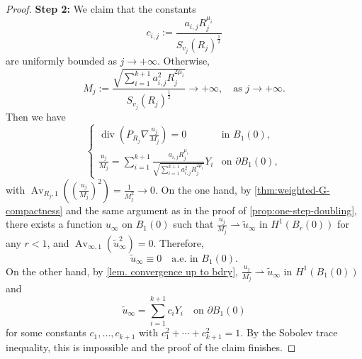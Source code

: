 \documentclass[12pt]{amsart}
\theoremstyle{plain}
\theoremstyle{definition}
\theoremstyle{remark}     %
\numberwithin{equation}{section}
\begin{document}
\begin{proof}
{\bf Step 2:} 
We claim that the constants 
\[
    c_{i,j}:=\frac{a_{i,j} R_j^{\mu_i}}{S_{v_j}(R_j)^{\frac{1}{2}}}
\]
are uniformly bounded as $j\to+\infty$. Otherwise, 
\[
    M_j:=\frac{\sqrt{\sum_{i=1}^{k+1} a_{i,j}^2R_j^{2\mu_i}}}
    {S_{v_j}(R_j)^{\frac{1}{2}}}\to +\infty,
    \quad\text{as }j\to+\infty.
\]
Then we have
\[
    \begin{cases}
        \operatorname{div}
        \left(
        P_{R_j}\nabla \frac{u_j}{M_j}
        \right)=0
        &\text{in }B_{1}(0),\\
        \frac{u_j}{M_j}=\sum_{i=1}^{k+1}
        \frac{a_{i,j} R_j^{\mu_i}}
        {\sqrt{\sum_{i=1}^{k+1} a_{i,j}^2R_j^{2\mu_i}}}Y_i
        &\text{on }\partial B_{1}(0),
    \end{cases}
\]
with $\operatorname{Av}_{R_j,1}\left(
(\frac{u_j}{M_j})^2\right)=\frac{1}{M_j^2}\to 0.$ 
On the one hand, by \cref{thm:weighted-G-compactness} and the same argument as in the proof of \cref{prop:one-step-doubling}, there exists a function $u_\infty$ on $B_1(0)$ such that $\frac{u_j}{M_j}\rightharpoonup \tilde u_\infty$ in $H^1(B_r(0))$ for any $r<1$, and $\operatorname{Av}_{\infty,1}(\tilde u_\infty^2)
    =0.$ Therefore,
\[
    \tilde u_\infty\equiv 0\quad \text{a.e. in }
    B_1(0).
\]
 On the other hand, by \cref{lem. convergence up to bdry}, $\frac{u_j}{M_j}\rightharpoonup \tilde u_\infty$ in $H^1(B_1(0))$ and 
\[
    \tilde u_\infty=\sum_{i=1}^{k+1} c_i Y_i\quad 
    \text{on }\partial B_1(0)
\]
for some constants $c_1,\dots, c_{k+1}$ with $c_1^2+\cdots+c_{k+1}^2=1$. By the Sobolev trace inequality, this is impossible and the proof of the claim finishes.


\end{proof}
\end{document}
